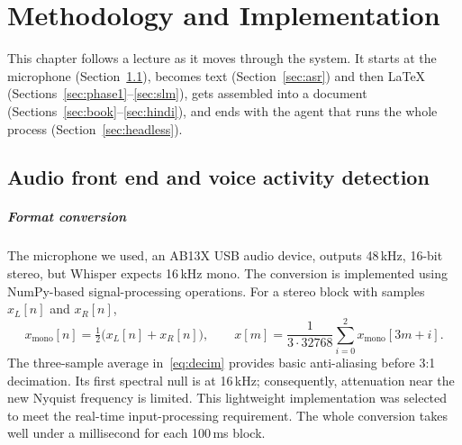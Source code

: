\documentclass[11pt,a4paper,oneside]{report}
\theoremstyle{definition}
\begin{document}
\chapter{Methodology and Implementation}
\label{chap:method}

This chapter follows a lecture as it moves through the system. It starts at the microphone (Section~\ref{sec:audio}), becomes text (Section~\ref{sec:asr}) and then LaTeX (Sections~\ref{sec:phase1}--\ref{sec:slm}), gets assembled into a document (Sections~\ref{sec:book}--\ref{sec:hindi}), and ends with the agent that runs the whole process (Section~\ref{sec:headless}).

\section{Audio front end and voice activity detection}
\label{sec:audio}

\paragraph{Format conversion} The microphone we used, an AB13X USB audio device, outputs 48\,kHz, 16-bit stereo, but Whisper expects 16\,kHz mono. The conversion is implemented using NumPy-based signal-processing operations. For a stereo block with samples $x_L[n]$ and $x_R[n]$,
\begin{equation}
  x_{\text{mono}}[n] = \tfrac{1}{2}\bigl(x_L[n] + x_R[n]\bigr), \qquad
  x[m] = \frac{1}{3\cdot 32768}\sum_{i=0}^{2} x_{\text{mono}}[3m+i].
  \label{eq:decim}
\end{equation}
The three-sample average in~\eqref{eq:decim} provides basic anti-aliasing before 3:1 decimation. Its first spectral null is at 16\,kHz; consequently, attenuation near the new Nyquist frequency is limited. This lightweight implementation was selected to meet the real-time input-processing requirement. The whole conversion takes well under a millisecond for each 100\,ms block.
\end{document}
